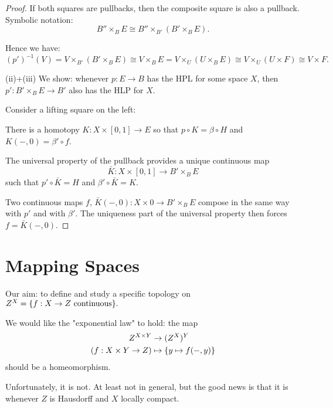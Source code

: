 \begin{proof}
If both squares are pullbacks, then the composite square is also a pullback. Symbolic notation:
\[B''\times_B E\cong B''\times_{B'}(B'\times_B E).\]

Hence we have:
\[(p')^{-1}(V)=V\times_{B'}(B'\times_B E)\cong V\times_B E = V\times_U(U\times_B E)\cong V\times_U(U\times F)\cong V\times F.\]

(ii)+(iii) We show: whenever $p:E\to B$ has the HPL for some space $X$, then $p':B'\times_B E\to B'$ also has the HLP for $X$.

Consider a lifting square on the left:
\begin{center}
\end{center}

There is a homotopy $K:X\times[0,1]\to E$ so that $p\circ K=\beta\circ H$ and $K(-,0)=\beta'\circ f$.

The universal property of the pullback provides a unique continuous map
\[\bar K:X\times[0,1]\to B'\times_B E\]
such that $p'\circ \bar K=H$ and $\beta'\circ\bar K=K$.

Two continuous maps $f,\,\bar K(-,0):X\times0\to B'\times_B E$ compose in the same way with $p'$ and with $\beta'$. The uniqueness part of the universal property then forces $f=\bar K(-,0)$.
\end{proof}

\section{Mapping Spaces}

Our aim: to define and study a specific topology on $Z^X=\{f:X\to Z\text{ continuous}\}.$

We would like the "exponential law" to hold: the map
\begin{align*}
    Z^{X\times Y}&\to(Z^X)^Y\\
    (f:X\times Y\to Z)&\mapsto \{y\mapsto f(-,y)\}
\end{align*}
\[\]
\[\]
should be a homeomorphism.

Unfortunately, it is not. At least not in general, but the good news is that it is whenever $Z$ is Hausdorff and $X$ locally compact.

